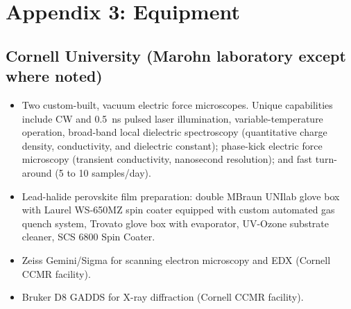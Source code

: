\documentclass{NSF}
\begin{document}
\clearpage
\setcounter{page}{1}

\section*{Appendix 3: Equipment}

\subsection{Cornell University (Marohn laboratory except where noted)}\hfill

\begin{itemize}

\item Two custom-built, vacuum electric force microscopes.  Unique capabilities include CW and 0.5~ns pulsed laser illumination, variable-temperature operation, broad-band local dielectric spectroscopy (quantitative charge density, conductivity, and dielectric constant); phase-kick electric force microscopy (transient conductivity, nanosecond resolution); and fast turn-around (5 to 10 samples/day).

\item Lead-halide perovskite film preparation: double MBraun UNIlab glove box with Laurel WS-650MZ spin coater equipped with custom automated gas quench system, Trovato glove box with evaporator, UV-Ozone substrate cleaner, SCS 6800 Spin Coater.

%

\item Zeiss Gemini/Sigma for scanning electron microscopy and EDX (Cornell CCMR facility).

\item Bruker D8 GADDS for X-ray diffraction (Cornell CCMR facility).

\end{itemize}
\end{document}
